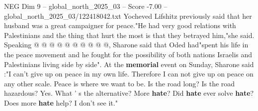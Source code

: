 \begin{textsample}{NEG Dim 9 – global\_north\_2025\_03 – Score -7.00 – global\_north\_2025\_03/122418042.txt}
Yocheved Lifshitz previously said that her husband was a great campaigner for peace."He had very good relations with Palestinians and the thing that hurt the most is that they betrayed him,"she said.
Speaking @ @ @ @ @ @ @ @ @ @, Sharone said that Oded had"spent his life in the peace movement and he fought for the possibility of both nations Israelis and Palestinians living side by side".
At the \textbf{memorial} event on Sunday, Sharone said :"I can't give up on peace in my own life.
Therefore I can not give up on peace on any other scale.
Peace is where we want to be.
Is the road long?
Is the road hazardous?
Yes.
What ' s the alternative?
More \textbf{hate}?
Did \textbf{hate} ever solve \textbf{hate}?
Does more \textbf{hate} help?
I don't see it."

\end{textsample}

